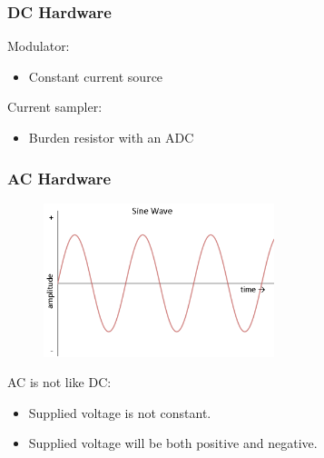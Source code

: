 \documentclass{beamer}
\begin{document}
	\begin{frame}\frametitle{DC Hardware}

		Modulator: 

		\begin{itemize}

			\item Constant current source

		\end{itemize}

		Current sampler: 

		\begin{itemize}

			\item Burden resistor with an ADC

		\end{itemize}
		
	\end{frame}




	\begin{frame}\frametitle{AC Hardware}

		\begin{figure}
			\centering
			\includegraphics[width=0.6\textwidth]{ac-sine-wave.png}
		\end{figure}

		AC is not like DC: 

		\begin{itemize}

			\item Supplied voltage is not constant.

			\item Supplied voltage will be both positive and negative.

		\end{itemize}

		
	\end{frame}
\end{document}
